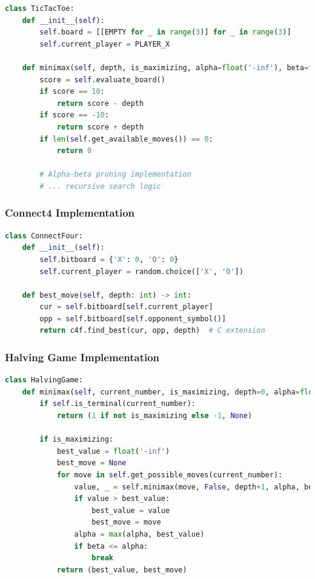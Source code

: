 \documentclass[12pt]{article}
\begin{document}
\begin{lstlisting}[language=Python, basicstyle=\small]
class TicTacToe:
    def __init__(self):
        self.board = [[EMPTY for _ in range(3)] for _ in range(3)]
        self.current_player = PLAYER_X
    
    def minimax(self, depth, is_maximizing, alpha=float('-inf'), beta=float('inf')):
        score = self.evaluate_board()
        if score == 10:
            return score - depth
        if score == -10:
            return score + depth
        if len(self.get_available_moves()) == 0:
            return 0
        
        # Alpha-beta pruning implementation
        # ... recursive search logic
\end{lstlisting}

\subsubsection{Connect4 Implementation}

\begin{lstlisting}[language=Python, basicstyle=\small]
class ConnectFour:
    def __init__(self):
        self.bitboard = {'X': 0, 'O': 0}
        self.current_player = random.choice(['X', 'O'])
    
    def best_move(self, depth: int) -> int:
        cur = self.bitboard[self.current_player]
        opp = self.bitboard[self.opponent_symbol()]
        return c4f.find_best(cur, opp, depth)  # C extension
\end{lstlisting}

\subsubsection{Halving Game Implementation}

\begin{lstlisting}[language=Python, basicstyle=\small]
class HalvingGame:
    def minimax(self, current_number, is_maximizing, depth=0, alpha=float('-inf'), beta=float('inf')):
        if self.is_terminal(current_number):
            return (1 if not is_maximizing else -1, None)
        
        if is_maximizing:
            best_value = float('-inf')
            best_move = None
            for move in self.get_possible_moves(current_number):
                value, _ = self.minimax(move, False, depth+1, alpha, beta)
                if value > best_value:
                    best_value = value
                    best_move = move
                alpha = max(alpha, best_value)
                if beta <= alpha:
                    break
            return (best_value, best_move)
\end{lstlisting}
\end{document}
